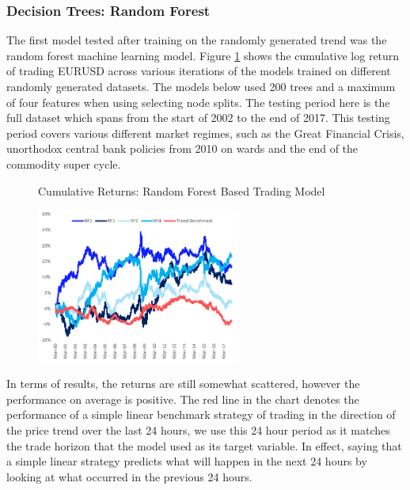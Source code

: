 \documentclass[11pt]{article}
\begin{document}
\subsubsection{Decision Trees: Random Forest}
 The first model tested after training on the randomly generated trend was the random forest machine learning model. Figure \ref{fig:RFRandomDataResults} shows the cumulative log return of trading EURUSD across various iterations of the models trained on different randomly generated datasets. The models below used 200 trees and a maximum of four features when using selecting node splits. The testing period here is the full dataset which spans from the start of 2002 to the end of 2017. This testing period covers various different market regimes, such as the Great Financial Crisis, unorthodox central bank policies from 2010 on wards and the end of the commodity super cycle. 
\begin{figure}[h]
    \centering
	\caption{Cumulative Returns: Random Forest Based Trading Model}    
	\includegraphics[width=0.6\textwidth]{RFRandomDataResults}
    \label{fig:RFRandomDataResults}
     \caption*{}
\end{figure}
In terms of results, the returns are still somewhat scattered, however the performance on average is positive. The red line in the chart denotes the performance of a simple linear benchmark strategy of trading in the direction of  the price trend over the last 24 hours, we use this 24 hour period as it matches the trade horizon that the model used as its target variable. In effect, saying that a simple linear strategy predicts what will happen in the next 24 hours by looking at what occurred in the previous 24 hours.
\end{document}
